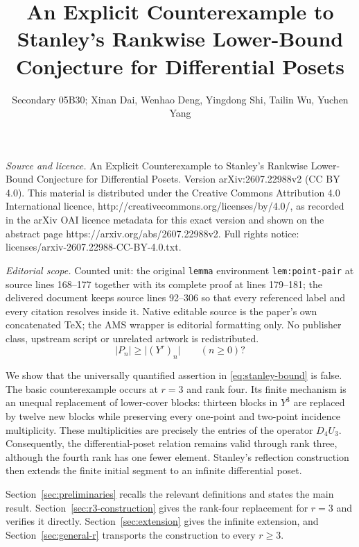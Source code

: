 \documentclass[10pt,a4paper]{amsart}
\newcommand{\card}[1]{\lvert #1\rvert}
\begin{document}
\title[An Explicit Counterexample to Stanley's Rankwise Lower-Bound]{An Explicit Counterexample to Stanley's Rankwise Lower-Bound Conjecture for Differential Posets}
\author{Secondary 05B30; Xinan Dai, Wenhao Deng, Yingdong Shi, Tailin Wu, Yuchen Yang}
\date{}
\maketitle
\noindent\emph{Source and licence.} An Explicit Counterexample to Stanley's Rankwise Lower-Bound Conjecture for Differential Posets. Version arXiv:2607.22988v2 (CC BY 4.0). This material is distributed under the Creative Commons Attribution 4.0 International licence, http://creativecommons.org/licenses/by/4.0/, as recorded in the arXiv OAI licence metadata for this exact version and shown on the abstract page https://arxiv.org/abs/2607.22988v2. Full rights notice: licenses/arxiv-2607.22988-CC-BY-4.0.txt.\par\smallskip
\noindent\textit{Editorial scope.} Counted unit: the original \texttt{lemma} environment \texttt{lem:point-pair} at source lines 168--177 together with its complete proof at lines 179--181; the delivered document keeps source lines 92--306 so that every referenced label and every citation resolves inside it. Native editable source is the paper's own concatenated TeX; the AMS wrapper is editorial formatting only. No publisher class, upstream script or unrelated artwork is redistributed.
\begin{equation}\label{eq:stanley-bound}
  \card{P_n}\geq \card{(Y^r)_n}
  \qquad(n\geq0)?
\end{equation}

We show that the universally quantified assertion in \eqref{eq:stanley-bound} is false. The basic counterexample occurs at $r=3$ and rank four. Its finite mechanism is an unequal replacement of lower-cover blocks: thirteen blocks in $Y^3$ are replaced by twelve new blocks while preserving every one-point and two-point incidence multiplicity. These multiplicities are precisely the entries of the operator $D_4U_3$. Consequently, the differential-poset relation remains valid through rank three, although the fourth rank has one fewer element. Stanley's reflection construction then extends the finite initial segment to an infinite differential poset.

Section~\ref{sec:preliminaries} recalls the relevant definitions and states the main result. Section~\ref{sec:r3-construction} gives the rank-four replacement for $r=3$ and verifies it directly. Section~\ref{sec:extension} gives the infinite extension, and Section~\ref{sec:general-r} transports the construction to every $r\geq3$.
\end{document}
